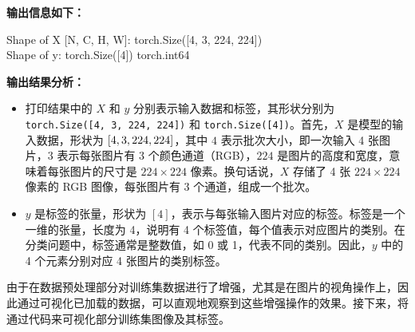 \textbf{输出信息如下：}
\vspace{-2mm} %
\begin{tcolorbox}[colframe=blue!50!black, colback=blue!10!white, coltitle=black, sharp corners, top=0mm, bottom=0mm, boxrule=0.8mm]
Shape of X [N, C, H, W]:  torch.Size([4, 3, 224, 224]) \\
Shape of y:  torch.Size([4]) torch.int64
\end{tcolorbox}
\vspace{-2mm} %
\textbf{输出结果分析：}
\begin{itemize}
    \item 打印结果中的 $X$ 和 $y$ 分别表示输入数据和标签，其形状分别为 \texttt{torch.Size([4, 3, 224, 224])} 和 \texttt{torch.Size([4])}。首先，$X$ 是模型的输入数据，形状为 $[4, 3,\\ 224, 224]$，其中 $4$ 表示批次大小，即一次输入 4 张图片，$3$ 表示每张图片有 3 个颜色通道（RGB），$224$ 是图片的高度和宽度，意味着每张图片的尺寸是 $224 \times 224$ 像素。换句话说，$X$ 存储了 4 张 $224 \times 224$ 像素的 RGB 图像，每张图片有 3 个通道，组成一个批次。

    \item $y$ 是标签的张量，形状为 $[4]$，表示与每张输入图片对应的标签。标签是一个一维的张量，长度为 4，说明有 4 个标签值，每个值表示对应图片的类别。在分类问题中，标签通常是整数值，如 0 或 1，代表不同的类别。因此，$y$ 中的 4 个元素分别对应 4 张图片的类别标签。
\end{itemize}

由于在数据预处理部分对训练集数据进行了增强，尤其是在图片的视角操作上，因此通过可视化已加载的数据，可以直观地观察到这些增强操作的效果。接下来，将通过代码来可视化部分训练集图像及其标签。

